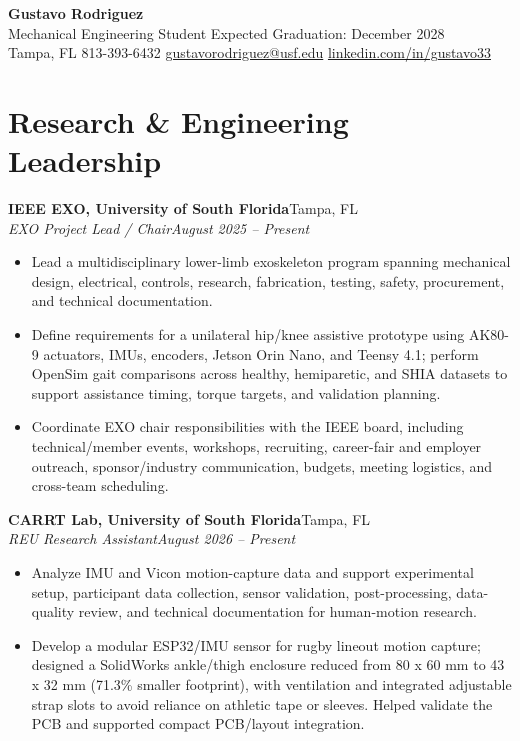 \documentclass[9pt]{article}
\newcommand{\role}[4]{\textbf{#1}\hfill #2\\\textit{#3}\hfill \textit{#4}\\[-2pt]}
\begin{document}
\begin{center}
{\LARGE\bfseries Gustavo Rodriguez}\\[2pt]
Mechanical Engineering Student \textbar{} Expected Graduation: December 2028\\
Tampa, FL \textbar{} 813-393-6432 \textbar{} \href{mailto:gustavorodriguez@usf.edu}{gustavorodriguez@usf.edu} \textbar{} \href{https://www.linkedin.com/in/gustavo33}{linkedin.com/in/gustavo33}
\end{center}
\vspace{-5pt}

\section{Research \& Engineering Leadership}
\role{IEEE EXO, University of South Florida}{Tampa, FL}{EXO Project Lead / Chair}{August 2025 -- Present}
\begin{itemize}
\item Lead a multidisciplinary lower-limb exoskeleton program spanning mechanical design, electrical, controls, research, fabrication, testing, safety, procurement, and technical documentation.
\item Define requirements for a unilateral hip/knee assistive prototype using AK80-9 actuators, IMUs, encoders, Jetson Orin Nano, and Teensy 4.1; perform OpenSim gait comparisons across healthy, hemiparetic, and SHIA datasets to support assistance timing, torque targets, and validation planning.
\item Coordinate EXO chair responsibilities with the IEEE board, including technical/member events, workshops, recruiting, career-fair and employer outreach, sponsor/industry communication, budgets, meeting logistics, and cross-team scheduling.
\end{itemize}

\role{CARRT Lab, University of South Florida}{Tampa, FL}{REU Research Assistant}{August 2026 -- Present}
\begin{itemize}
\item Analyze IMU and Vicon motion-capture data and support experimental setup, participant data collection, sensor validation, post-processing, data-quality review, and technical documentation for human-motion research.
\item Develop a modular ESP32/IMU sensor for rugby lineout motion capture; designed a SolidWorks ankle/thigh enclosure reduced from 80 x 60 mm to 43 x 32 mm (71.3\% smaller footprint), with ventilation and integrated adjustable strap slots to avoid reliance on athletic tape or sleeves. Helped validate the PCB and supported compact PCB/layout integration.
\end{itemize}
\end{document}
